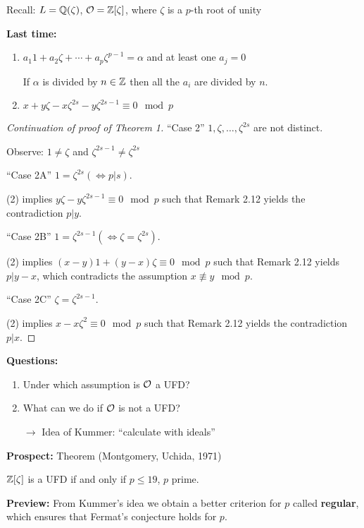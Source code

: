 

Recall: $L=\mathbb{Q}(\zeta)$, $\mathcal{O} = \mathbb{Z}[\zeta]$, where $\zeta$ is a $p$-th root of unity

\bigskip
\textbf{Last time:}
\begin{enumerate}[(1)]
	\item $a_1 1 +a_2 \zeta + \cdots + a_p\zeta^{p-1} =\alpha$ and at least one $a_j=0$
	
	If $\alpha$ is divided by $n \in \mathbb{Z}$ then all the $a_i$ are divided by $n$.
	

\item $x+y\zeta-x\zeta^{2s} -y\zeta^{2s-1} \equiv 0 \mod p$
\end{enumerate}

\begin{proof}[Continuation of proof of Theorem 1]
	\enquote{Case 2} $1, \zeta, \dots, \zeta^ {2s}$ are not distinct.
	
	Observe: $1 \neq \zeta$ and $\zeta^ {2s-1} \neq \zeta^ {2s}$
	
	\bigskip \enquote{Case 2A} $1 = \zeta^ {2s} (\Leftrightarrow p|s)$.
	
	(2) implies $y\zeta -y\zeta ^{2s-1} \equiv 0 \mod p$ such that Remark 2.12 yields the contradiction $p|y$.
	
	\bigskip \enquote{Case 2B}  $1 = \zeta^ {2s-1} (\Leftrightarrow \zeta = \zeta^ {2s})$.
	
	(2) implies $(x-y)1 + (y-x) \zeta \equiv 0 \mod p$ such that Remark 2.12 yields $p | y-x$, which contradicts the assumption $x \not \equiv y \mod p$.
	
	\bigskip \enquote{Case 2C} $\zeta = \zeta^ {2s-1}$.
	
	(2) implies $x-x\zeta^2 \equiv 0 \mod p$ such that Remark 2.12 yields the contradiction $p|x$.
\end{proof}

\textbf{Questions:}
\begin{enumerate}[(1)]
\item Under which assumption is $\mathcal{O}$ a UFD?
\item What can we do if $\mathcal{O}$ is not a UFD?

$\rightarrow$ Idea of Kummer: \enquote{calculate with ideals}
\end{enumerate}

\bigskip\textbf{Prospect:} Theorem (Montgomery, Uchida, 1971)

$\mathbb{Z}[\zeta]$ is a UFD if and only if $p\leq 19$, $p$ prime.

\bigskip
\textbf{Preview:} From Kummer's idea we obtain a better criterion
 for $p$ called \textbf{regular}, which ensures that Fermat's conjecture holds for $p$.
 

